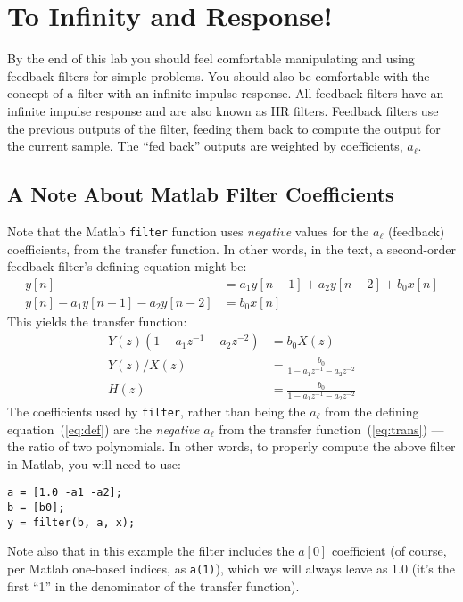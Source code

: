 
\section{To Infinity and Response!}

By the end of this lab you should feel comfortable manipulating and
using feedback filters for simple problems. You should also be
comfortable with the concept of a filter with an infinite impulse
response. All feedback filters have an infinite impulse response
and are also known as IIR filters. Feedback filters use the previous
outputs of the filter, feeding them back to compute the output for the
current sample. The ``fed back'' outputs are weighted by coefficients,
$a_\ell$.

\subsection{A Note About Matlab Filter Coefficients}

Note that the Matlab \verb|filter| function uses \emph{negative}
values for the $a_\ell$ (feedback) coefficients, from the transfer
function. In other words, in the text, a second-order feedback
filter's defining equation might be:
\begin{align}
  y[n] &= a_1 y[n-1] + a_2 y[n-2] + b_0 x[n] \label{eq:def} \\
  y[n] -a_1 y[n-1] - a_2 y[n-2]&=   b_0 x[n]
\end{align}
This yields the transfer function:
\begin{align}
  Y(z)(1 - a_1 z^{-1} - a_2 z^{-2}) &= b_0X(z) \\
  Y(z)/X(z) &= \frac{b_0}{1 - a_1 z^{-1} - a_2 z^{-2}} \\
  H(z) &= \frac{b_0}{1 - a_1 z^{-1} - a_2 z^{-2}} \label{eq:trans} 
\end{align}
The coefficients used by \verb|filter|, rather than being the $a_\ell$
from the defining equation~(\ref{eq:def}) are the \emph{negative}
$a_\ell$ from the transfer function~(\ref{eq:trans}) --- the ratio of
two polynomials. In other words, to properly compute the above filter
in Matlab, you will need to use:
\begin{lstlisting}[style=Matlab-editor,basicstyle=\mlttfamily\small]
a = [1.0 -a1 -a2];
b = [b0];
y = filter(b, a, x);
\end{lstlisting}
Note also that in this example the filter includes the $a[0]$
coefficient (of course, per Matlab one-based indices, as \verb|a(1)|),
which we will always leave as 1.0 (it's the first ``1'' in the
denominator of the transfer function).

